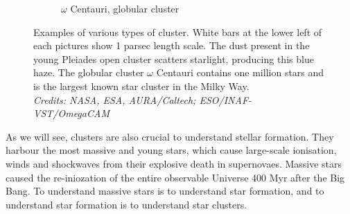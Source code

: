 \begin{figure}
\begin{subfigure}[b]{0.4\textwidth}
        \caption{$\omega$ Centauri, globular cluster}
        \label{Fig:0_openglobular1.glob}
    \end{subfigure}
     \caption{Examples of various types of cluster. White bars at the lower left of each pictures show 1 parsec length scale. The dust present in the young Pleiades open cluster scatters starlight, producing this blue haze. The globular cluster $\omega$ Centauri contains one million stars and is the largest known star cluster in the Milky Way.\\\textit{Credits: NASA, ESA, AURA/Caltech; ESO/INAF-VST/OmegaCAM}}
     \label{Fig:0_openglobular}
\end{figure}



As we will see, clusters are also crucial to understand stellar formation. They harbour the most massive and young stars, which cause large-scale ionisation, winds and shockwaves from their explosive death in supernovaes. Massive stars caused the re-iniozation of the entire observable Universe 400 Myr after the Big Bang. To understand massive stars is to understand star formation, and to understand star formation is to understand star clusters.



%
%


